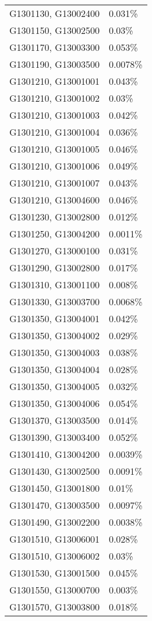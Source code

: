 \begin{longtable}[]{@{}ll@{}}
G1301130, G13002400 & 0.031\% \\
G1301150, G13002500 & 0.03\% \\
G1301170, G13003300 & 0.053\% \\
G1301190, G13003500 & 0.0078\% \\
G1301210, G13001001 & 0.043\% \\
G1301210, G13001002 & 0.03\% \\
G1301210, G13001003 & 0.042\% \\
G1301210, G13001004 & 0.036\% \\
G1301210, G13001005 & 0.046\% \\
G1301210, G13001006 & 0.049\% \\
G1301210, G13001007 & 0.043\% \\
G1301210, G13004600 & 0.046\% \\
G1301230, G13002800 & 0.012\% \\
G1301250, G13004200 & 0.0011\% \\
G1301270, G13000100 & 0.031\% \\
G1301290, G13002800 & 0.017\% \\
G1301310, G13001100 & 0.008\% \\
G1301330, G13003700 & 0.0068\% \\
G1301350, G13004001 & 0.042\% \\
G1301350, G13004002 & 0.029\% \\
G1301350, G13004003 & 0.038\% \\
G1301350, G13004004 & 0.028\% \\
G1301350, G13004005 & 0.032\% \\
G1301350, G13004006 & 0.054\% \\
G1301370, G13003500 & 0.014\% \\
G1301390, G13003400 & 0.052\% \\
G1301410, G13004200 & 0.0039\% \\
G1301430, G13002500 & 0.0091\% \\
G1301450, G13001800 & 0.01\% \\
G1301470, G13003500 & 0.0097\% \\
G1301490, G13002200 & 0.0038\% \\
G1301510, G13006001 & 0.028\% \\
G1301510, G13006002 & 0.03\% \\
G1301530, G13001500 & 0.045\% \\
G1301550, G13000700 & 0.003\% \\
G1301570, G13003800 & 0.018\% \\

\end{longtable}
